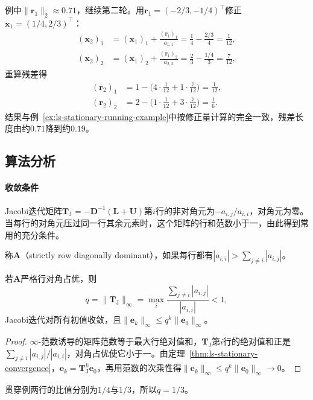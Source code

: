\begin{enumerate}
 例中$\lVert\bm r_1\rVert_2\approx0.71$，继续第二轮。用$\bm r_1=(-2/3,-1/4)^\top$修正$\bm x_1=(1/4,2/3)^\top$：
 \[
  \begin{aligned}
  (\bm x_2)_1&=(\bm x_1)_1+\frac{(\bm r_1)_1}{a_{1,1}}=\frac14-\frac{2/3}{4}=\frac1{12},\\
  (\bm x_2)_2&=(\bm x_1)_2+\frac{(\bm r_1)_2}{a_{2,2}}=\frac23-\frac{1/4}{3}=\frac7{12},
  \end{aligned}
 \]
 重算残差得
 \[
  \begin{aligned}
  (\bm r_2)_1&=1-\bigl(4\cdot\tfrac1{12}+1\cdot\tfrac7{12}\bigr)=\tfrac1{12},\\
  (\bm r_2)_2&=2-\bigl(1\cdot\tfrac1{12}+3\cdot\tfrac7{12}\bigr)=\tfrac16 .
  \end{aligned}
 \]
 结果与例~\ref{ex:ls-stationary-running-example}中按修正量计算的完全一致，残差长度由约$0.71$降到约$0.19$。
\end{enumerate}

\subsection{算法分析}

\paragraph{收敛条件}
Jacobi迭代矩阵$\bm T_{\mathrm J}=-\bm D^{-1}(\bm L+\bm U)$第$i$行的非对角元为$-a_{i,j}/a_{i,i}$，对角元为零。当每行的对角元压过同一行其余元素时，这个矩阵的行和范数小于一，由此得到常用的充分条件。

称$\bm A$（strictly row diagonally dominant），如果每行都有$|a_{i,i}|>\sum_{j\neq i}|a_{i,j}|$。
\begin{theorem}[Jacobi迭代的收敛条件]
\label{thm:ls-jacobi-convergence}
若$\bm A$严格行对角占优，则
\begin{equation}
q=\lVert\bm T_{\mathrm J}\rVert_\infty=\max_i\frac{\sum_{j\neq i}|a_{i,j}|}{|a_{i,i}|}<1,
 \label{eq:ls-jacobi-contraction}
\end{equation}
Jacobi迭代对所有初值收敛，且$\lVert\bm e_k\rVert_\infty\leq q^k\lVert\bm e_0\rVert_\infty$。
\end{theorem}
\begin{proof}
$\infty$-范数诱导的矩阵范数等于最大行绝对值和，$\bm T_{\mathrm J}$第$i$行的绝对值和正是$\sum_{j\neq i}|a_{i,j}|/|a_{i,i}|$，对角占优使它小于一。由定理~\ref{thm:ls-stationary-convergence}，$\bm e_k=\bm T_{\mathrm J}^k\bm e_0$，再用范数的次乘性得$\lVert\bm e_k\rVert_\infty\leq q^k\lVert\bm e_0\rVert_\infty\to0$。
\end{proof}
贯穿例两行的比值分别为$1/4$与$1/3$，所以$q=1/3$。


